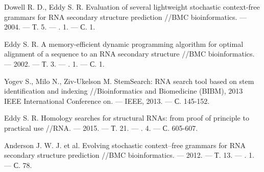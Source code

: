 \documentclass[a5paper]{article}
\begin{document}


%


\begin{thebibliography}{99}
  
Dowell R. D., Eddy S. R. Evaluation of several lightweight stochastic context-free grammars for RNA 
secondary structure prediction //BMC bioinformatics. --- 2004. --- Т. 5. --- \textnumero. 1. --- С. 1.

Eddy S. R. A memory-efficient dynamic programming algorithm for optimal alignment of a sequence to 
an RNA secondary structure //BMC bioinformatics. --- 2002. --- Т. 3. --- \textnumero. 1. --- С. 1.

Yogev S., Milo N., Ziv-Ukelson M. StemSearch: RNA search tool based on stem identification and indexing //Bioinformatics and Biomedicine (BIBM), 2013 IEEE International Conference on. --- IEEE, 2013. --- С. 145-152.

Eddy S. R. Homology searches for structural RNAs: from proof of principle to practical use //RNA. --- 2015. --- Т. 21. --- \textnumero. 4. --- С. 605-607.

Anderson J. W. J. et al. Evolving stochastic context--free grammars for RNA secondary structure prediction //BMC bioinformatics. --- 2012. --- Т. 13. --- \textnumero. 1. --- С. 78.



\end{thebibliography}
\end{document}
